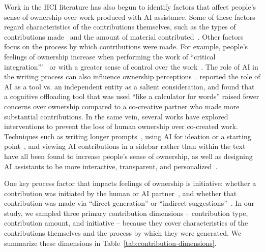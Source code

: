 Work in the HCI literature has also begun to identify factors that affect people's sense of ownership over work produced with AI assistance. Some of these factors regard characteristics of the contributions themselves, such as the types of contributions made~\cite{rezwana2023user, he2024ai, wan2024coco, xu2024makes} and the amount of material contributed~\cite{lee2022coauthor}. Other factors focus on the process by which contributions were made. For example, people's feelings of ownership increase when performing the work of ``critical integration'''~\cite{sarkar2023exploring} or with a greater sense of control over the work~\cite{draxler2024ai, louie2020novice, xu2024makes}. The role of AI in the writing process can also influence ownership perceptions~\cite{draxler2024ai, rezwana2023user, gero2019metaphoria, xu2024makes}. \citet{rezwana2023user} reported the role of AI as a tool vs. an independent entity as a salient consideration, and \citet{gero2019metaphoria} found that a cognitive offloading tool that was used ``like a calculator for words'' raised fewer concerns over ownership compared to a co-creative partner who made more substantial contributions. In the same vein, several works have explored interventions to prevent the loss of human ownership over co-created work. Techniques such as writing longer prompts~\cite{joshi2024writing}, using AI for ideation or a starting point~\cite{biermann2022tool}, and viewing AI contributions in a sidebar rather than within the text~\cite{kim2024towards} have all been found to increase people's sense of ownership, as well as designing AI assistants to be more interactive, transparent, and personalized~\cite{gero2019metaphoria, neate2019empowering}.

One key process factor that impacts feelings of ownership is initiative: whether a contribution was initiated by the human or AI partner~\cite{rezwana2023user}, and whether that contribution was made via ``direct generation'' or ``indirect suggestions''~\cite{wan2024coco}. In our study, we sampled three primary contribution dimensions -- contribution type, contribution amount, and initiative -- because they cover characteristics of the contributions themselves and the process by which they were generated. We summarize these dimensions in Table~\ref{tab:contribution-dimensions}.

